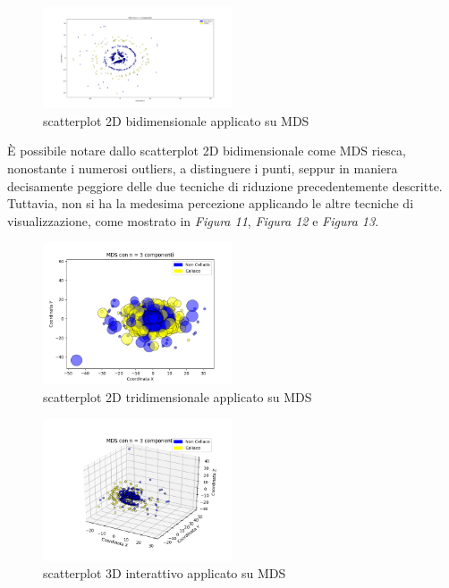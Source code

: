 \documentclass[11pt,a4paper,twocolumn]{article}
\begin{document}
	\begin{figure}[h]
		\centering
		\includegraphics[width=0.5\textwidth]{img/MDS_2Dnc2.png}
		\caption{scatterplot 2D bidimensionale applicato su MDS}
	\end{figure}
	È possibile notare dallo scatterplot 2D bidimensionale come MDS riesca, nonostante i numerosi outliers, a distinguere i punti, seppur in maniera decisamente peggiore delle due tecniche di riduzione precedentemente descritte. Tuttavia, non si ha la medesima percezione applicando le altre tecniche di visualizzazione, come mostrato in \emph{Figura 11}, \emph{Figura 12} e \emph{Figura 13}.
	\begin{figure}[h]
		\centering
		\includegraphics[width=0.5\textwidth]{img/MDS_2Dnc3.png}
		\caption{scatterplot 2D tridimensionale applicato su MDS}
	\end{figure}

	\begin{figure}[h]
		\centering
		\includegraphics[width=0.5\textwidth]{img/MDS_i3D.png}
		\caption{scatterplot 3D interattivo applicato su MDS}
	\end{figure}
\end{document}
